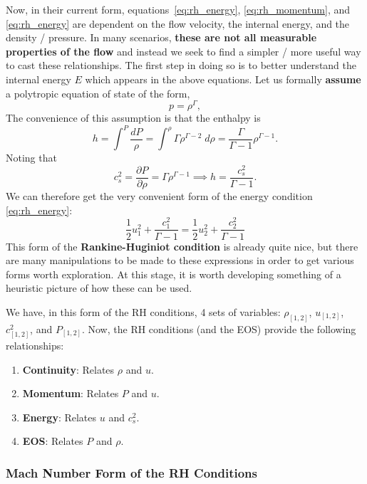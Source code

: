 Now, in their current form, equations~\ref{eq:rh_energy}, \eqref{eq:rh_momentum}, and \eqref{eq:rh_energy} are dependent on the flow velocity, the internal energy, and the density / pressure. In many scenarios,\textbf{ these are not all measurable properties of the flow} and instead we seek to find a simpler / more useful way to cast these relationships. The first step in doing so is to better understand the internal energy $E$ which appears in the above equations. Let us formally \textbf{assume} a polytropic equation of state of the form,
\[
p = \rho^\Gamma,
\]
The convenience of this assumption is that the enthalpy is 
\[
h = \int^P \frac{dP}{\rho} = \int^\rho \Gamma \rho^{\Gamma -2} \;d \rho = \frac{\Gamma}{\Gamma -1} \rho^{\Gamma -1}.
\]
Noting that
\[
c_s^2 = \frac{\partial P}{\partial \rho} = \Gamma \rho^{\Gamma -1} \implies \boxed{h = \frac{c_s^2}{\Gamma -1}.}
\]
We can therefore get the very convenient form of the energy condition \eqref{eq:rh_energy}:
\begin{equation}
    \label{eq:rh_energy_enth}
    \boxed{
    \frac{1}{2}u_1^2 + \frac{c_1^2}{\Gamma -1} = \frac{1}{2}u_2^2 +\frac{c_2^2}{\Gamma -1}
    }
\end{equation}
This form of the \textbf{Rankine-Huginiot condition} is already quite nice, but there are many manipulations to be made to these expressions in order to get various forms worth exploration. At this stage, it is worth developing something of a heuristic picture of how these can be used.
\par
We have, in this form of the RH conditions, 4 sets of variables: $\rho_{[1,2]}$, $u_{[1,2]}$, $c_{[1,2]}^2$, and $P_{[1,2]}$. Now, the RH conditions (and the EOS) provide the following relationships:
\vspace{0.5cm}
\begin{enumerate}
    \item \textbf{Continuity}: Relates $\rho$ and $u$.
    \item \textbf{Momentum}: Relates $P$ and $u$.
    \item \textbf{Energy}: Relates $u$ and $c_s^2$.
    \item \textbf{EOS}: Relates $P$ and $\rho$.
\end{enumerate}
\vspace{0.5cm}
\subsubsection*{Mach Number Form of the RH Conditions}

